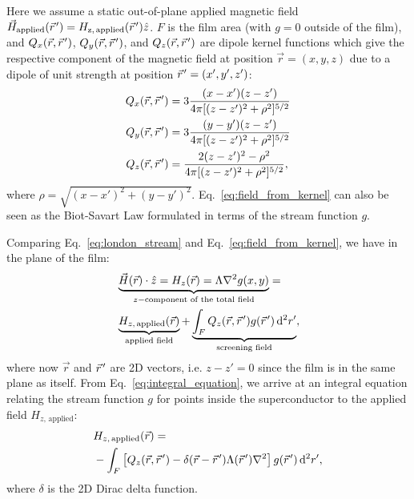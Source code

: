 \documentclass[final,3p,times,twocolumn]{elsarticle}
\newcommand{\pvec}[1]{\vec{#1}\mkern2mu\vphantom{#1}}
\newcounter{bla}
\begin{document}
Here we assume a static out-of-plane applied magnetic field $\vec{H}_\mathrm{applied}(\pvec{r}')=H_\mathrm{z,\,\mathrm{applied}}(\pvec{r}')\hat{z}$. $F$ is the film area (with $g = 0$ outside of the film), and $Q_x(\vec{r},\pvec{r}')$, $Q_y(\vec{r},\pvec{r}')$, and $Q_z(\vec{r},\pvec{r}')$ are dipole kernel functions which give the respective component of the magnetic field at position $\vec{r}=(x, y, z)$ due to a dipole of unit strength at position $\pvec{r}'=(x', y', z')$:
\begin{align}
    \label{eq:kernels}
    \begin{split}
        Q_x(\vec{r}, \pvec{r}') &=  3\frac{(x-x')(z-z')}
        {4\pi[(z-z')^2+\rho^2]^{5/2}}\\
        Q_y(\vec{r}, \pvec{r}') &=  3\frac{(y-y')(z-z')}
        {4\pi[(z-z')^2+\rho^2]^{5/2}}\\
        Q_z(\vec{r}, \pvec{r}') &=  \frac{2(z-z')^2-\rho^2}
        {4\pi[(z-z')^2+\rho^2]^{5/2}},
    \end{split}
\end{align}
where $\rho=\sqrt{(x-x')^2 + (y-y')^2}$. Eq.~\ref{eq:field_from_kernel} can also be seen as the Biot-Savart Law formulated in terms of the stream function $g$.

Comparing Eq.~\ref{eq:london_stream} and Eq.~\ref{eq:field_from_kernel}, we have in the plane of the film:
\begin{align}
    \label{eq:integral_equation}
    \begin{split}
        &\underbrace{\vec{H}(\vec{r})\cdot\hat{z} = H_z(\vec{r})
        = \Lambda\nabla^2g(x, y)}_{z-\text{component of the total field}}
        = \\ & \underbrace{H_{z,\,\mathrm{applied}}(\vec{r})}_{\text{applied field}}
        + \underbrace{\int_F Q_z(\vec{r},\pvec{r}')g(\pvec{r}')\,\mathrm{d}^2r'}_{\text{screening field}},
    \end{split}
\end{align}
where now $\vec{r}$ and $\pvec{r}'$ are 2D vectors, i.e. $z-z'=0$ since the film is in the same plane as itself. From Eq.~\ref{eq:integral_equation}, we arrive at an integral equation relating the stream function $g$ for points inside the superconductor to the applied field $H_{z,\,\mathrm{applied}}$:
\begin{align}
\begin{split}
    \label{eq:applied_to_stream}
    &H_{z,\,\mathrm{applied}}(\vec{r})
    = \\ &-\int_F\left[
        Q_z(\vec{r},\pvec{r}')-\delta(\vec{r}-\pvec{r}')\Lambda(\pvec{r}')\nabla^2\right
    ]g(\pvec{r}')\,\mathrm{d}^2r',
\end{split}
\end{align}
where $\delta$ is the 2D Dirac delta function.
\end{document}
